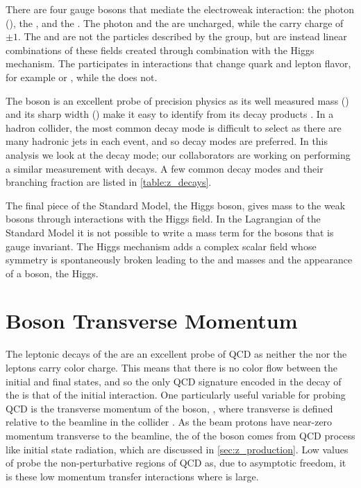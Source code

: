 There are four gauge bosons that mediate the electroweak interaction: the photon
(\photon), the \Z, and the \Wpm. The photon and the \Z are uncharged, while the
\Wpm carry charge of $\pm1$. The \W and \Z are not the particles described by
the \SUtwoUone group, but are instead linear combinations of these fields
created through combination with the Higgs mechanism. The \W participates in
interactions that change quark and lepton flavor, for example \tWdecay or
\mutoWnu, while the \Z does not.

The \Z boson is an excellent probe of precision physics as its well measured
mass (\Zmass) and its sharp width (\Zwidth) make it easy to identify from its
decay products \cite{pdg2014}. In a hadron collider, the most common \Ztoqq
decay mode is difficult to select as there are many hadronic jets in each
event, and so \Ztoll decay modes are preferred. In this analysis we look at the
\Ztoee decay mode; our collaborators are working on performing a similar
measurement with \Ztomumu decays. A few common decay modes and their branching
fraction are listed in \cref{table:z_decays}.



The final piece of the Standard Model, the Higgs boson, gives mass to the weak
bosons through interactions with the Higgs field. In the Lagrangian of the
Standard Model it is not possible to write a mass term for the bosons
that is gauge invariant. The Higgs mechanism adds a complex scalar field whose
symmetry is spontaneously broken leading to the \W and \Z masses and the
appearance of a \spinzero boson, the Higgs.

\section{\texorpdfstring{\Z}{Z} Boson Transverse Momentum}

The leptonic decays of the \Z are an excellent probe of QCD as neither the \Z
nor the leptons carry color charge. This means that there is no color flow
between the initial and final states, and so the only QCD signature encoded in
the decay of the \Z is that of the initial interaction. One particularly useful
variable for probing QCD is the transverse momentum of the \Z boson, \bosonpt,
where transverse is defined relative to the beamline in the collider
\cite{bozzi_2011}\cite{mantry_2011}\cite{becher_2011}. As the beam protons have
near-zero momentum transverse to the beamline, the \bosonpt of the \Z boson
comes from QCD process like initial state radiation, which are discussed in
\cref{sec:z_production}. Low values of \bosonpt probe the non-perturbative
regions of QCD as, due to asymptotic freedom, it is these low momentum transfer
interactions where \alphastrong is large.

